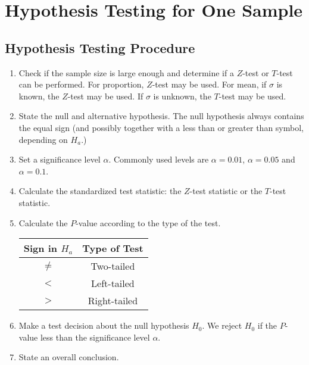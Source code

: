
\hypertarget{hypothesis-testing-for-one-sample}{%
\section{Hypothesis Testing for One
Sample}\label{hypothesis-testing-for-one-sample}}

\hypertarget{hypothesis-testing-procedure}{%
\subsection{Hypothesis Testing
Procedure}\label{hypothesis-testing-procedure}}

\begin{enumerate}[sepno]
\item
  Check if the sample size is large enough and determine if a \(Z\)-test
  or \(T\)-test can be performed. For proportion, \(Z\)-test may be
  used. For mean, if \(\sigma\) is known, the \(Z\)-test may be used. If
  \(\sigma\) is unknown, the \(T\)-test may be used.
\item
  State the null and alternative hypothesis. The null hypothesis always
  contains the equal sign (and possibly together with a less than or
  greater than symbol, depending on \(H_a\).)
\item
  Set a significance level \(\alpha\). Commonly used levels are
  \(\alpha=0.01\), \(\alpha=0.05\) and \(\alpha=0.1\).
\item
  Calculate the standardized test statistic: the \(Z\)-test statistic or
  the \(T\)-test statistic.
\item
  Calculate the \(P\)-value according to the type of the test.

  \begin{tabular}{cc}
    \toprule
    Sign in \(H_a\) & Type of Test\\
    \midrule
    \(\ne\) & Two-tailed\\
    \(<\) &  Left-tailed\\
    \(>\) & Right-tailed\\
    \bottomrule
  \end{tabular}
  
\item
  Make a test decision about the null hypothesis \(H_0\). We reject
  \(H_0\) if the \(P\)-value less than the significance level
  \(\alpha\).
\item
  State an overall conclusion.
\end{enumerate}
\vspace*{-0.5\baselineskip}

